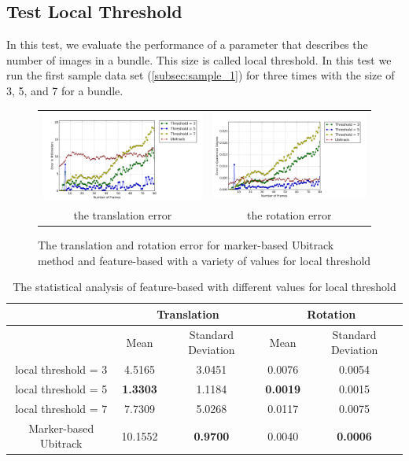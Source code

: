 \subsection{Test Local Threshold}
In this test, we evaluate the performance of a parameter that describes the number of images in a bundle. This size is called local threshold. In this test we run the first sample data set (\autoref{subsec:sample_1}) for three times with the size of 3, 5, and 7 for a bundle.
\begin{figure}[H]
\centering
\begin{tabular}{cc}
  \includegraphics[width=80mm]{figures/local/graph_translation} &   \includegraphics[width=80mm]{figures/local/graph_rotation}  \\
  the translation error & the rotation error \\[6pt]
\end{tabular}
\caption{The translation and rotation error for marker-based Ubitrack method and feature-based with a variety of values for local threshold}\label{fig:test_local_threshold}
\end{figure}

\begin{table}[H]
\centering
  \begin{tabular}{| c || c | c | c | c |}
      \hline
      & \multicolumn{2}{c|}{Translation} & \multicolumn{2}{c|}{Rotation} \\ \hline
       & Mean & Standard Deviation & Mean & Standard Deviation \\ \hline
      local threshold = 3 & 4.5165 & 3.0451 & 0.0076 & 0.0054 \\ \hline
      local threshold = 5 & \textbf{1.3303} & 1.1184 & \textbf{0.0019} & 0.0015 \\ \hline
      local threshold = 7 & 7.7309 & 5.0268 & 0.0117 & 0.0075 \\ \hline
      Marker-based Ubitrack & 10.1552 & \textbf{0.9700} & 0.0040 & \textbf{0.0006} \\ \hline
  \end{tabular}
  \caption{The statistical analysis of feature-based with different values for local threshold} \label{tab:test_local_threshold}
\end{table}

